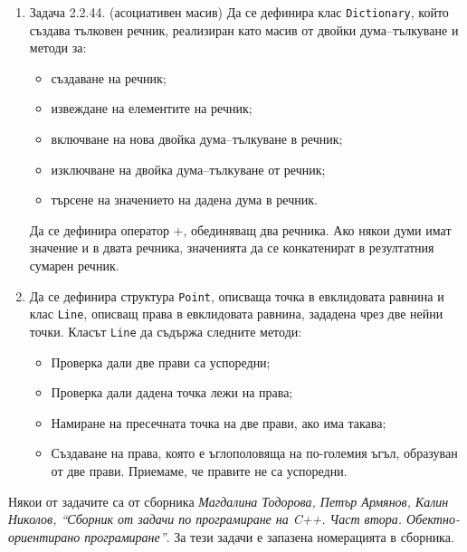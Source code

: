 \documentclass[12pt,a4paper]{article}
\newcommand{\code}[1]{\texttt{#1}}
\begin{document}
\begin{enumerate}
\item Задача 2.2.44. (асоциативен масив) Да се дефинира клас \texttt{Dictionary}, който създава тълковен речник, реализиран като масив от двойки дума–тълкуване и методи за:

\begin{itemize}

\item създаване на речник;
\item извеждане на елементите на речник;
\item включване на нова двойка дума–тълкуване в речник;
\item изключване на двойка дума–тълкуване от речник;
\item търсене на значението на дадена дума в речник.

\end{itemize}

Да се дефинира оператор +, обединяващ два речника. Ако някои думи имат значение и в двата речника, значенията да се конкатенират в резултатния сумарен речник.

\item Да се дефинира структура \code{Point}, описваща точка в евклидовата равнина и клас  \code{Line}, описващ права в евклидовата равнина, зададена чрез две нейни точки. Класът \code{Line} да съдържа следните методи:

\begin{itemize}
	\item Проверка дали две прави са успоредни;
	\item Проверка дали дадена точка лежи на права;
	\item Намиране на пресечната точка на две прави, ако има такава;
	\item Създаване на права, която е ъглополовяща на по-големия ъгъл, образуван от две прави. Приемаме, че правите не са успоредни.
\end{itemize}

\end{enumerate}


	\vspace{20px}

	\small{Някои от задачите са от сборника \textit{Магдалина Тодорова, Петър Армянов, Калин Николов, ``Сборник от задачи по програмиране на C++. Част втора. Обектно-ориентирано програмиране''}. За тези задачи е запазена номерацията в сборника.}
\end{document}

